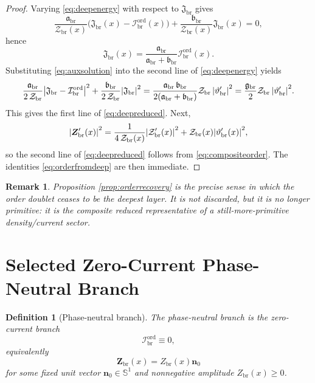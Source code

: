 \documentclass[11pt]{article}
\newcommand{\RespOrderField}{\bm Z_{\mathrm{br}}}
\newcommand{\RespOrderAmp}{Z_{\mathrm{br}}}
\newcommand{\RespOrderCurrent}{\mathcal I_{\mathrm{br}}^{\mathrm{ord}}}
\newcommand{\RespOrderPhase}{\vartheta_{\mathrm{br}}}
\newcommand{\RespOrderDir}{\bm n_0}
\newcommand{\RespDeepDensity}{\mathcal Z_{\mathrm{br}}}
\newcommand{\RespDeepTrack}{\mathfrak a_{\mathrm{br}}}
\newcommand{\RespDeepRelax}{\mathfrak b_{\mathrm{br}}}
\newcommand{\RespDeepStiff}{\mathfrak g_{\mathrm{br}}}
\newcommand{\RespDeepAux}{\mathfrak J_{\mathrm{br}}}
\newtheorem{definition}{Definition}
\newtheorem{remark}{Remark}
\begin{document}
\begin{proof}
Varying \eqref{eq:deepenergy} with respect to \(\RespDeepAux\) gives
\begin{equation}
\frac{\RespDeepTrack}{\RespDeepDensity(x)}\bigl(\RespDeepAux(x)-\RespOrderCurrent(x)\bigr)
+
\frac{\RespDeepRelax}{\RespDeepDensity(x)}\RespDeepAux(x)
=0,
\label{eq:auxvariation}
\end{equation}
hence
\begin{equation}
\RespDeepAux(x)
=
\frac{\RespDeepTrack}{\RespDeepTrack+\RespDeepRelax}\RespOrderCurrent(x).
\label{eq:auxsolution}
\end{equation}
Substituting \eqref{eq:auxsolution} into the second line of \eqref{eq:deepenergy} yields
\begin{equation}
\frac{\RespDeepTrack}{2\,\RespDeepDensity}\abs{\RespDeepAux-\RespOrderCurrent}^2
+
\frac{\RespDeepRelax}{2\,\RespDeepDensity}\abs{\RespDeepAux}^2
=
\frac{\RespDeepTrack\,\RespDeepRelax}{2(\RespDeepTrack+\RespDeepRelax)}\RespDeepDensity\,\abs{\RespOrderPhase'}^2
=
\frac{\RespDeepStiff}{2}\RespDeepDensity\,\abs{\RespOrderPhase'}^2.
\label{eq:phasecost}
\end{equation}
This gives the first line of \eqref{eq:deepreduced}. Next,
\[
\abs{\RespOrderField'(x)}^2
=
\frac{1}{4\,\RespDeepDensity(x)}\abs{\RespDeepDensity'(x)}^2
+
\RespDeepDensity(x)\abs{\RespOrderPhase'(x)}^2,
\]
so the second line of \eqref{eq:deepreduced} follows from \eqref{eq:compositeorder}. The identities \eqref{eq:orderfromdeep} are then immediate.
\end{proof}

\begin{remark}
Proposition \ref{prop:orderrecovery} is the precise sense in which the order doublet ceases to be the deepest layer. It is not discarded, but it is no longer primitive: it is the composite reduced representative of a still-more-primitive density/current sector.
\end{remark}

\section{Selected Zero-Current Phase-Neutral Branch}

\begin{definition}[Phase-neutral branch]
\label{def:neutralbranch}
The \emph{phase-neutral branch} is the zero-current branch
\begin{equation}
\RespOrderCurrent\equiv0,
\label{eq:zerocurrent}
\end{equation}
equivalently
\begin{equation}
\RespOrderField(x)=\RespOrderAmp(x)\RespOrderDir
\label{eq:neutralfield}
\end{equation}
for some fixed unit vector \(\RespOrderDir\in\mathbb S^1\) and nonnegative amplitude \(\RespOrderAmp(x)\ge0\).
\end{definition}
\end{document}
